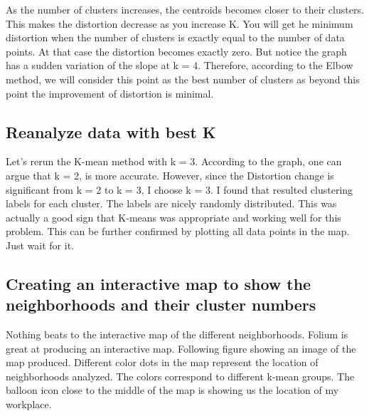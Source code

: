 \documentclass[11pt]{article}
\begin{document}
    \begin{center}
    \end{center}
    
    As the number of clusters increases, the centroids becomes closer to
their clusters. This makes the distortion decrease as you increase K.
You will get he minimum distortion when the number of clusters is
exactly equal to the number of data points. At that case the distortion becomes exactly
zero. But notice the graph has a sudden variation of the slope at k = 4.
Therefore, according to the Elbow method, we will consider this point as
the best number of clusters as beyond this point the improvement of
distortion is minimal.

\hypertarget{reanalize-data-with-best-k}{%
\subsection{Reanalyze data with best
K}\label{reanalize-data-with-best-k}}

Let's rerun the K-mean method with k = 3. According to the graph, one
can argue that k = 2, is more accurate. However, since the Distortion
change is significant from k = 2 to k = 3, I choose k = 3. I found that resulted clustering labels for each cluster. The labels are nicely randomly distributed. This was actually a good sign that K-means was appropriate and
working well for this problem. This can be further confirmed by plotting
all data points in the map. Just wait for it.

  
            
    \hypertarget{creating-an-interactive-map-to-show-the-neighborhoods-and-their-cluster-numbers}{%
\subsection{Creating an interactive map to show the neighborhoods
and their cluster
numbers}\label{creating-an-interactive-map-to-show-the-neigborhoods-and-their-cluster-numbers}}

Nothing beats to the interactive map of the different neighborhoods. Folium is great at producing an interactive map. Following figure showing an image of the map produced. Different color dots in the map represent the location of neighborhoods analyzed. The colors correspond to different k-mean groups. The balloon icon close to the middle of the map is showing us the location of my workplace. 
\end{document}
